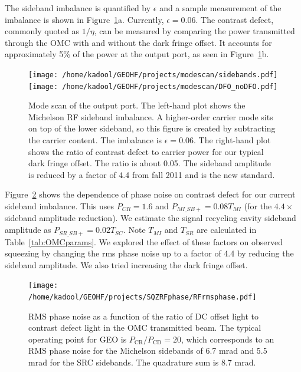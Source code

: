 \documentclass{ligodoc}
\begin{document}
The sideband imbalance is quantified by $\epsilon$ and a sample
measurement of the imbalance is shown in
Figure~\ref{fig:modescan}a. Currently, $\epsilon=0.06$. The contrast
defect, commonly quoted as $1/\eta$, can be measured by comparing the
power transmitted through the OMC with and without the dark fringe
offset. It accounts for approximately 5\% of the power at the output
port, as seen in Figure~\ref{fig:modescan}b.

\begin{figure}
\begin{centering}
\texttt{[image: /home/kadool/GEOHF/projects/modescan/sidebands.pdf]}\texttt{[image: /home/kadool/GEOHF/projects/modescan/DFO\_noDFO.pdf]}
\caption{Mode scan of the output port. The left-hand plot shows the
  Michelson RF sideband imbalance. A higher-order carrier mode sits on
  top of the lower sideband, so this figure is created by subtracting
  the carrier content. The imbalance is $\epsilon = 0.06$. The
  right-hand plot shows the ratio of contrast defect to carrier power
  for our typical dark fringe offset. The ratio is about 0.05. The
  sideband amplitude is reduced by a factor of 4.4 from fall 2011 and
  is the new standard.}
\label{fig:modescan}
\end{centering}
\end{figure}

Figure~\ref{fig:phirms} shows the dependence of phase noise on
contrast defect for our current sideband imbalance. This uses
$P_{CR}=1.6$ and $P_{MI\_SB+}=0.08 T_{MI}$ (for the $4.4\times$
sideband amplitude reduction). We estimate the signal recycling cavity
sideband amplitude as $P_{SR\_SB+}=0.02 T_{SC}$. Note $T_{MI}$ and
$T_{SR}$ are calculated in Table~\ref{tab:OMCparams}. We explored the
effect of these factors on observed squeezing by changing the rms
phase noise up to a factor of 4.4 by reducing the sideband
amplitude. We also tried increasing the dark fringe offset. 


\begin{figure}
\begin{centering}
\texttt{[image: /home/kadool/GEOHF/projects/SQZRFphase/RFrmsphase.pdf]}
\caption{RMS phase noise as a function of the ratio of DC offset light
  to contrast defect light in the OMC transmitted beam. The typical
  operating point for GEO is $P_{\mathrm{CR}}/P_{\mathrm{CD}}=20$,
  which corresponds to an RMS phase noise for the Michelson sidebands
  of 6.7 mrad and 5.5 mrad for the SRC sidebands. The quadrature sum
  is 8.7 mrad.}
\label{fig:phirms}
\end{centering}
\end{figure}
\end{document}
